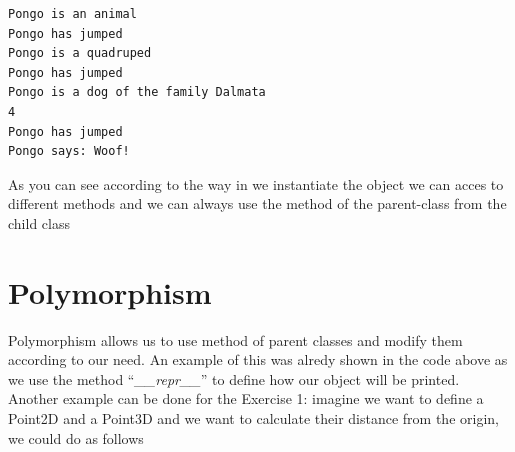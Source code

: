 \documentclass[11pt]{article}
\begin{document}
    \begin{Verbatim}[commandchars=\\\{\}]
Pongo is an animal
Pongo has jumped
Pongo is a quadruped
Pongo has jumped
Pongo is a dog of the family Dalmata
4
Pongo has jumped
Pongo says: Woof!
    \end{Verbatim}

    As you can see according to the way in we instantiate the object we can
acces to different methods and we can always use the method of the
parent-class from the child class

    \hypertarget{polymorphism}{%
\section{Polymorphism}\label{polymorphism}}

Polymorphism allows us to use method of parent classes and modify them
according to our need. An example of this was alredy shown in the code
above as we use the method ``\emph{\_\_repr\_\_}'' to define how our
object will be printed. Another example can be done for the Exercise 1:
imagine we want to define a Point2D and a Point3D and we want to
calculate their distance from the origin, we could do as follows
\end{document}
